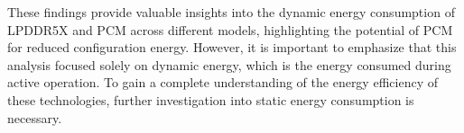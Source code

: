     
These findings provide valuable insights into the dynamic energy consumption of LPDDR5X and PCM across different models, highlighting the potential of PCM for reduced configuration energy.
However, it is important to emphasize that this analysis focused solely on dynamic energy, which is the energy consumed during active operation.
To gain a complete understanding of the energy efficiency of these technologies, further investigation into static energy consumption is necessary.
